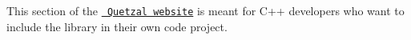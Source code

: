 This section of the \href{../../../pages/quetzal/home}{\texttt{ Quetzal website}} is meant for C++ developers who want to include the library in their own code project. 